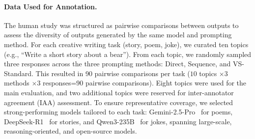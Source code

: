 

\paragraph{Data Used for Annotation.}
The human study was structured as pairwise comparisons between outputs to assess the diversity of outputs generated by the same model and prompting method. 
For each creative writing task (story, poem, joke), we curated ten topics (e.g., ``Write a short story about a bear''). 
From each topic, we randomly sampled three responses across the three prompting methods: Direct, Sequence, and VS-Standard. 
This resulted in 90 pairwise comparisons per task ($10$ topics $\times 3$ methods $\times 3$ responses=$90$ pairwise comparisons). 
Eight topics were used for the main evaluation, and two additional topics were reserved for inter-annotator agreement (IAA) assessment.
To ensure representative coverage, we selected strong-performing models tailored to each task: Gemini-2.5-Pro~\citep{comanici2025gemini25pushingfrontier} for poems, DeepSeek-R1~\citep{deepseekai2025deepseekr1incentivizingreasoningcapability} for stories, and Qwen3-235B~\citep{yang2025qwen3technicalreport} for jokes, spanning large-scale, reasoning-oriented, and open-source models.

